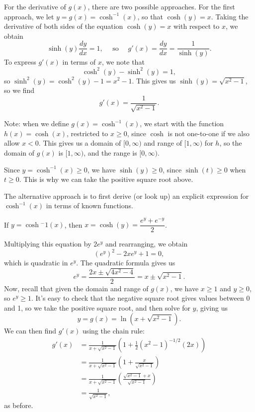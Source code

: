 \documentclass[12pt]{article}
\begin{document}
\begin{enumerate}
 For the derivative of $g(x)$, there are two possible approaches. For the first approach, we let $y=g(x) = \cosh^{-1}(x)$, so that $\cosh(y)=x$. Taking the derivative of both sides of the equation $\cosh(y)=x$ with respect to $x$, we obtain
 \[
 \sinh(y)\frac{dy}{dx}  = 1, \quad \text{ so } \quad g'(x) = \frac{dy}{dx} = \frac{1}{\sinh(y)}.
 \]
 To express $g'(x)$ in terms of $x$, we note that
 \[
 \cosh^2(y)-\sinh^2(y) = 1,
 \]
 so $\sinh^2(y) = \cosh^2(y)-1 = x^2-1$. This gives us $\sinh(y) = \sqrt{x^2-1}$, so we find
 \[
 g'(x) = \frac{1}{\sqrt{x^2-1}}.
 \]
 
 Note: when we define $g(x) = \cosh^{-1}(x)$, we start with the function $h(x) = \cosh(x)$, restricted to $x\geq 0$, since $\cosh$ is not one-to-one if we also allow $x<0$. This gives us a domain of $[0,\infty)$ and range of $[1,\infty)$ for $h$, so the domain of $g(x)$ is $[1,\infty)$, and the range is $[0,\infty)$.

Since $y=\cosh^{-1}(x)\geq 0$, we have $\sinh(y)\geq 0$, since $\sinh(t)\geq 0$ when $t\geq 0$. This is why we can take the positive square root above.

\bigskip

The alternative approach is to first derive (or look up) an explicit expression for $\cosh^{-1}(x)$ in terms of known functions.

If $y=\cosh{^-1}(x)$, then $x = \cosh(y) = \dfrac{e^y+e^{-y}}{2}$.

Multiplying this equation by $2e^y$ and rearranging, we obtain
\[
(e^y)^2-2xe^y+1=0,
\]
which is quadratic in $e^y$. The quadratic formula gives us
\[
e^y = \frac{2x\pm\sqrt{4x^2-4}}{2} = x\pm \sqrt{x^2-1}.
\]
Now, recall that given the domain and range of $g(x)$, we have $x\geq 1$ and $y\geq 0$, so $e^y\geq 1$. It's easy to check that the negative square root gives values between 0 and 1, so we take the positive square root, and then solve for $y$, giving us
\[
y=g(x) = \ln(x+\sqrt{x^2-1}).
\]
We can then find $g'(x)$ using the chain rule:
\begin{align*}
g'(x) & = \frac{1}{x+\sqrt{x^2-1}}\left(1+\frac{1}{2}(x^2-1)^{-1/2}(2x)\right)\\
 & = \frac{1}{x+\sqrt{x^2-1}}\left(1+\frac{x}{\sqrt{x^2-1}}\right)\\
 & = \frac{1}{x+\sqrt{x^2-1}}\left(\frac{\sqrt{x^2-1}+x}{\sqrt{x^2-1}}\right)\\
 & = \frac{1}{\sqrt{x^2-1}},
\end{align*}
as before.
 
\end{enumerate}
\end{document}
